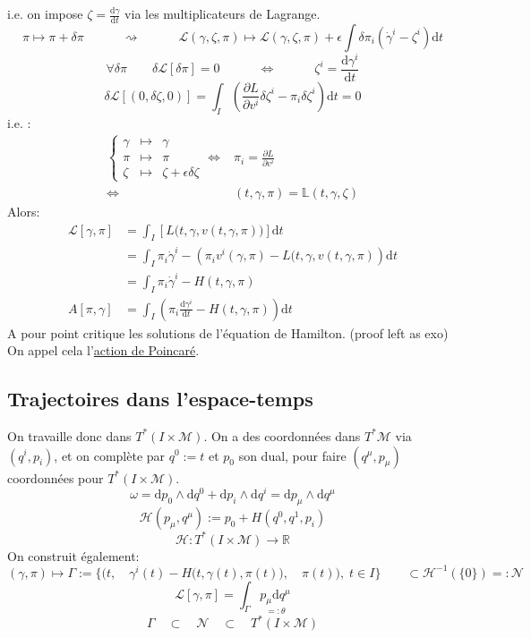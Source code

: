 \documentclass[a4paper,11pt]{article}
\renewcommand{\d}{{\mathrm{d}}}
\newcommand{\dr}[2]{\frac{\partial {#1}}{\partial{#2}}}
\begin{document}
\color{red}i.e. on impose $\zeta = \frac{\d \gamma}{\d t}$ via les multiplicateurs de Lagrange.\color{black}
$$\pi \mapsto \pi + \delta \pi \quad \quad \quad \rightsquigarrow \quad\quad\quad
\mathcal{L}(\gamma,\zeta,\pi) \mapsto \mathcal{L}(\gamma,\zeta,\pi) + \epsilon \int \delta\pi_i (\dot\gamma^i - \zeta^i)\d t$$
$$\forall\delta\pi \quad \quad \delta\mathcal{L}[\delta\pi]=0 \quad \quad \quad \iff\quad \quad \quad \zeta^i = \frac{\d\gamma^i}{\d t}$$
$$\delta\mathcal{L}[(0,\delta\zeta,0)] = \int_I \left(\dr L{v^i}\delta\zeta^i-\pi_i\delta\zeta^i\right)\d t = 0$$
i.e. :
\begin{align*}
\left\{\begin{matrix}
\gamma & \mapsto & \gamma\\
\pi & \mapsto & \pi\\
\zeta & \mapsto & \zeta + \epsilon\delta\zeta
\end{matrix}\right.
\iff & \pi_i = \dr L{v^i}\\
\iff & (t,\gamma,\pi) = \mathbb{L}(t,\gamma, \zeta)
\end{align*}
Alors:
\begin{align*}
\mathcal{L}[\gamma,\pi] &= \int_I \left[L\big(t,\gamma,v(t,\gamma,\pi)\big)
\right] \d t\\
&= \int_I \pi_i \dot \gamma^i - \left(\pi_i v^i(\gamma,\pi) - L\big(t,\gamma,v(t,\gamma,\pi)\right)\d t\\
&= \int_I \pi_i\dot\gamma^i - H(t,\gamma,\pi)\\
A[\pi,\gamma] &= \int_I \left(\pi_i \frac{\d \gamma^i}{\d t}- H(t,\gamma,\pi)\right) \d t
\end{align*}
A pour point critique les solutions de l'équation de Hamilton. (proof left as exo)\\
On appel cela l'\underline{action de Poincaré}.

\subsection{Trajectoires dans l'espace-temps}
On travaille donc dans $T^*(I\times \mathcal{M})$. On a des coordonnées dans $T^*\mathcal{M}$ via $(q^i,p_i)$, et on complète par $q^0:=t$ et $p_0$ son dual, pour faire $(q^\mu,p_\mu)$ coordonnées pour $T^*(I\times \mathcal{M})$.
$$\omega = \d p_0 \wedge \d q^0 + \d p_i \wedge \d q^i = \d p_\mu \wedge \d q^\mu$$
$$\mathcal{H}(p_\mu, q^\mu):= p_0 + H(q^0,q^1,p_i)$$
$$\mathcal{H}: T^*(I\times\mathcal{M}) \to \mathbb{R}$$
On construit également:
$$(\gamma,\pi) \mapsto \Gamma:=\Bigg\{\bigg(t,\quad \gamma^i(t) - H\Big(t,\gamma(t),\pi(t)\Big),\quad\pi(t)\bigg),\; t\in I\Bigg\} \quad \quad \subset \mathcal{H}^{-1}(\{0\}) =: \mathcal{N}$$
$$\mathcal{L}[\gamma,\pi] = \int_\Gamma \underset{=:\theta}{p_\mu \d q^\mu}$$
$$\Gamma \quad \subset \quad \mathcal{N} \quad \subset \quad T^*(I\times\mathcal{M})$$
\end{document}
